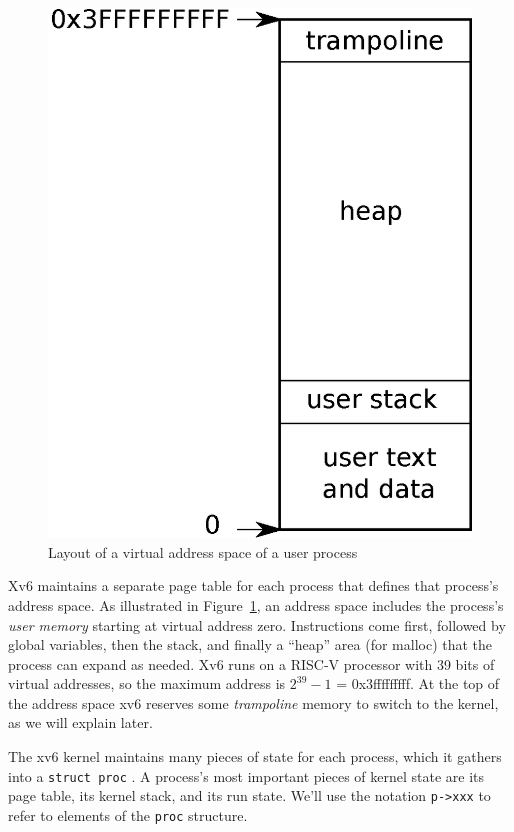 \begin{figure}[t]
\center
\includegraphics[scale=0.5]{fig/as.eps}
\caption{Layout of a virtual address space of a user process}
\label{fig:as}
\end{figure}

Xv6 maintains a separate page table for each process that defines that process's
address space.  As illustrated in 
Figure~\ref{fig:as},
an address space includes the process's
\textit{user memory}
starting at virtual address zero. Instructions come first,
followed by global variables, then the stack,
and finally a ``heap'' area (for malloc)
that the process can expand as needed.
Xv6 runs on a RISC-V processor with 39 bits of virtual addresses,
so the maximum address is $2^{39}-1$ = 0x3fffffffff.
At the top of the address space xv6 reserves some
\textit{trampoline}
memory to switch to the kernel, as we will explain later.

The xv6 kernel maintains many pieces of state for each process,
which it gathers into a
\lstinline{struct proc}
.
A process's most important pieces of kernel state are its 
page table, its kernel stack, and its run state.
We'll use the notation
\lstinline{p->xxx}
to refer to elements of the
\lstinline{proc}
structure.

